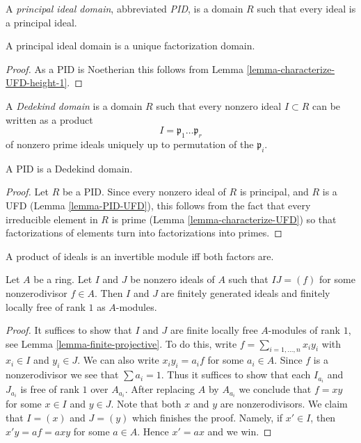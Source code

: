 \begin{definition}
\label{definition-PID}
A {\it principal ideal domain}, abbreviated {\it PID},
is a domain $R$ such that every ideal is a principal ideal.
\end{definition}

\begin{lemma}
\label{lemma-PID-UFD}
A principal ideal domain is a unique factorization domain.
\end{lemma}

\begin{proof}
As a PID is Noetherian this follows from
Lemma \ref{lemma-characterize-UFD-height-1}.
\end{proof}

\begin{definition}
\label{definition-dedekind-domain}
A {\it Dedekind domain} is a domain $R$ such that every
nonzero ideal $I \subset R$ can be written as a product
$$
I = \mathfrak p_1 \ldots \mathfrak p_r
$$
of nonzero prime ideals uniquely up to permutation of the $\mathfrak p_i$.
\end{definition}

\begin{lemma}
\label{lemma-PID-dedekind}
A PID is a Dedekind domain.
\end{lemma}

\begin{proof}
Let $R$ be a PID. Since every nonzero ideal of $R$ is principal,
and $R$ is a UFD (Lemma \ref{lemma-PID-UFD}), this follows from
the fact that every irreducible element in $R$ is prime
(Lemma \ref{lemma-characterize-UFD})
so that factorizations of elements turn into factorizations into primes.
\end{proof}

\begin{lemma}
\label{lemma-product-ideals-principal}
\begin{slogan}
A product of ideals is an invertible module iff both factors are.
\end{slogan}
Let $A$ be a ring. Let $I$ and $J$ be nonzero ideals of $A$
such that $IJ = (f)$ for some nonzerodivisor $f \in A$. Then $I$ and $J$ are
finitely generated ideals and finitely locally free of rank $1$ as $A$-modules.
\end{lemma}

\begin{proof}
It suffices to show that $I$ and $J$ are finite locally free $A$-modules
of rank $1$, see Lemma \ref{lemma-finite-projective}.
To do this, write $f = \sum_{i = 1, \ldots, n} x_i y_i$ with $x_i \in I$
and $y_i \in J$. We can
also write $x_i y_i = a_i f$ for some $a_i \in A$.
Since $f$ is a nonzerodivisor we see that $\sum a_i = 1$.
Thus it suffices to show that each $I_{a_i}$ and
$J_{a_i}$ is free of rank $1$ over $A_{a_i}$. After replacing $A$ by
$A_{a_i}$ we conclude that $f = xy$ for some $x \in I$ and $y \in J$.
Note that both $x$ and $y$ are nonzerodivisors. We claim that
$I = (x)$ and $J = (y)$ which finishes the proof. Namely, if $x' \in I$,
then $x'y = af = axy$ for some $a \in A$. Hence $x' = ax$ and we win.
\end{proof}

